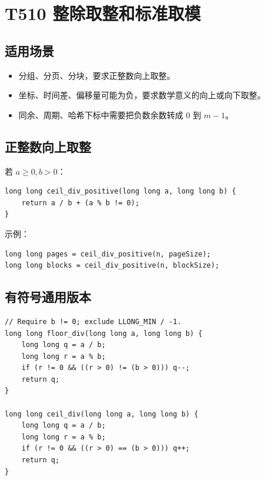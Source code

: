 
\section{T510 整除取整和标准取模}\label{sec:09-35}\label{tpl:510}

\subsection{适用场景}

\begin{itemize}
  \item 分组、分页、分块，要求正整数向上取整。
  \item 坐标、时间差、偏移量可能为负，要求数学意义的向上或向下取整。
  \item 同余、周期、哈希下标中需要把负数余数转成 $0$ 到 $m-1$。
\end{itemize}

\subsection{正整数向上取整}

若 $a \ge 0, b > 0$：

\begin{lstlisting}
long long ceil_div_positive(long long a, long long b) {
    return a / b + (a % b != 0);
}
\end{lstlisting}

示例：

\begin{lstlisting}
long long pages = ceil_div_positive(n, pageSize);
long long blocks = ceil_div_positive(n, blockSize);
\end{lstlisting}

\subsection{有符号通用版本}

\begin{lstlisting}
// Require b != 0; exclude LLONG_MIN / -1.
long long floor_div(long long a, long long b) {
    long long q = a / b;
    long long r = a % b;
    if (r != 0 && ((r > 0) != (b > 0))) q--;
    return q;
}

long long ceil_div(long long a, long long b) {
    long long q = a / b;
    long long r = a % b;
    if (r != 0 && ((r > 0) == (b > 0))) q++;
    return q;
}
\end{lstlisting}

